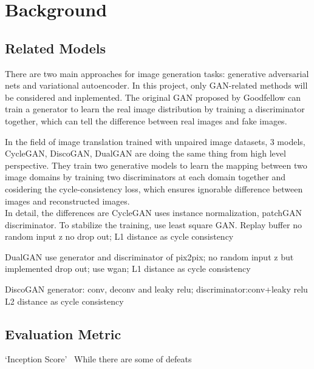 \chapter{Background}\label{Ch:Background}
\section{Related Models}
There are two main approaches for image generation tasks: generative adversarial nets and variational autoencoder. In this project, only GAN-related methods will be considered and inplemented.
The original GAN proposed by Goodfellow can train a generator to learn the real image distribution by training a discriminator together, which can tell the difference between real images and fake images.

In the field of image translation trained with unpaired image datasets, 3 models, CycleGAN, DiscoGAN, DualGAN are doing the same thing
from high level perspective. They train two generative models to learn the mapping between two image domains by training two discriminators
at each domain together and cosidering the cycle-consistency loss, which ensures ignorable difference between images and reconstructed images.
\\
In detail, the differences are
CycleGAN uses instance normalization, patchGAN discriminator. To stabilize the training, use least square GAN. Replay buffer
              no random input z no drop out; L1 distance as cycle consistency

DualGAN use generator and discriminator of pix2pix; no random input z but implemented drop out; use wgan;
             L1 distance as cycle consistency

DiscoGAN generator: conv, deconv and leaky relu; discriminator:conv+leaky relu  L2 distance as cycle consistency


\section{Evaluation Metric}

`Inception Score'~\cite{improved_tech_GANs}
While there are some of defeats ~\cite{note_on_inception}


